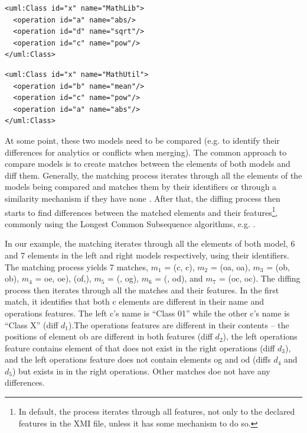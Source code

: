 \documentclass{llncs}
\begin{document}
\begin{minipage}[t]{0.49\linewidth} 
\begin{lstlisting}[style=eol,caption={The simplified XMI of the left model in Fig. \ref{fig:left}.},label=lst:leftxmi]
<uml:Class id="x" name="MathLib">
  <operation id="a" name="abs/>
  <operation id="d" name="sqrt"/>
  <operation id="c" name="pow"/>
</uml:Class>
\end{lstlisting}
\end{minipage}
\hfill
\begin{minipage}[t]{0.49\linewidth}
\begin{lstlisting}[style=eol,caption={The simplified XMI of the right model in Fig. \ref{fig:right}.},label=lst:rightxmi]
<uml:Class id="x" name="MathUtil">
  <operation id="b" name="mean"/>
  <operation id="c" name="pow"/>
  <operation id="a" name="abs"/>
</uml:Class>
\end{lstlisting}
\end{minipage}

At some point, these two models need to be compared (e.g. to identify their differences for analytics or conflicts when merging). The common approach to compare models is to create matches between the elements of both models and diff them. Generally, the matching process iterates through all the elements of the models being compared and matches them by their identifiers or through a similarity mechanism if they have none \cite{DBLP:conf/sfm/BroschKLSWW12,emfcompare2018developer}. After that, the diffing process then starts to find differences between the matched elements and their features\footnote{In default, the process iterates through all features, not only to the declared features in the XMI file, unless it has some mechanism to do so.}, commonly using the Longest Common Subsequence algorithms, e.g. \cite{DBLP:journals/algorithmica/Meyers86}. 

In our example, the matching iterates through all the elements of both model, 6 and 7 elements in the left and right models respectively, using their identifiers. The matching process yields 7 matches, $m_1$ = (\textsf{c}, \textsf{c}), $m_2$ = (\textsf{oa}, \textsf{oa}), $m_3$ = (\textsf{ob}, \textsf{ob}), $m_4$ = {\textsf{oe}, \textsf{oe}), (\textsf{of},), $m_5$ = (, \textsf{og}), $m_6$ = (, \textsf{od}), and $m_7$ = (\textsf{oc}, \textsf{oc}). The diffing process then iterates through all the matches and their features. In the first match, it identifies that both \textsf{c} elements are different in their \textsf{name} and \textsf{operations} features. The left \textsf{c}'s \textsf{name} is ``Class 01'' while the other \textsf{c}'s \textsf{name} is ``Class X'' (diff $d_1$).The \textsf{operations} features are different in their contents -- the positions of element \textsf{ob} are different in both features (diff $d_2$), the left \textsf{operations} feature contains element \textsf{of} that does not exist in the right \textsf{operations} (diff $d_3$}), and the left \textsf{operations} feature does not contain elements \textsf{og} and \textsf{od} (diffs $d_4$ and $d_5$) but exists in in the right \textsf{operations}. Other matches doe not have any differences.
\end{document}
